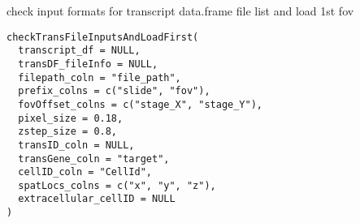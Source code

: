 \documentclass[letterpaper]{book}
\begin{document}
%
\begin{Description}
check input formats for transcript data.frame file list and load 1st fov
\end{Description}
%
\begin{Usage}
\begin{verbatim}
checkTransFileInputsAndLoadFirst(
  transcript_df = NULL,
  transDF_fileInfo = NULL,
  filepath_coln = "file_path",
  prefix_colns = c("slide", "fov"),
  fovOffset_colns = c("stage_X", "stage_Y"),
  pixel_size = 0.18,
  zstep_size = 0.8,
  transID_coln = NULL,
  transGene_coln = "target",
  cellID_coln = "CellId",
  spatLocs_colns = c("x", "y", "z"),
  extracellular_cellID = NULL
)
\end{verbatim}
\end{Usage}
%
\end{document}
